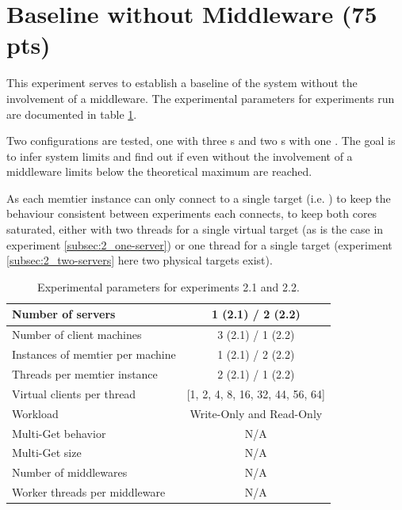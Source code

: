 \section{Baseline without Middleware (75 pts)\label{sec:2}}

    This experiment serves to establish a baseline of the system without the involvement of a middleware. The
    experimental parameters for experiments run are documented in table \ref{tab:20_setup}.

    Two configurations are tested, one \srv{} with three \cli{}s and two \srv{}s with one \cli{}. The goal is to infer
    system limits and find out if even without the involvement of a middleware limits below the theoretical maximum are
    reached.

    As each memtier instance can only connect to a single target (i.e. \srv{}) to keep the behaviour consistent between
    experiments each \cli{} connects, to keep both cores saturated, either with two threads for a single virtual target
    (as is the case in experiment \ref{subsec:2_one-server}) or one thread for a single target (experiment
    \ref{subsec:2_two-servers} \textemdash here two physical targets exist).

    \begin{table}
        \scriptsize{
            \begin{tabular}{|l|c|}
                \hline Number of servers                & 1 (2.1) / 2 (2.2) \\
                \hline Number of client machines        & 3 (2.1) / 1 (2.2) \\
                \hline Instances of memtier per machine & 1 (2.1) / 2 (2.2) \\
                \hline Threads per memtier instance     & 2 (2.1) / 1 (2.2) \\
                \hline Virtual clients per thread       & [1, 2, 4, 8, 16, 32, 44, 56, 64] \\
                \hline Workload                         & Write-Only and Read-Only \\
                \hline Multi-Get behavior               & N/A \\
                \hline Multi-Get size                   & N/A \\
                \hline Number of middlewares            & N/A \\
                \hline Worker threads per middleware    & N/A \\
                \hline
            \end{tabular}
        }
            \caption{Experimental parameters for experiments 2.1 and 2.2.\label{tab:20_setup}}
    \end{table}

